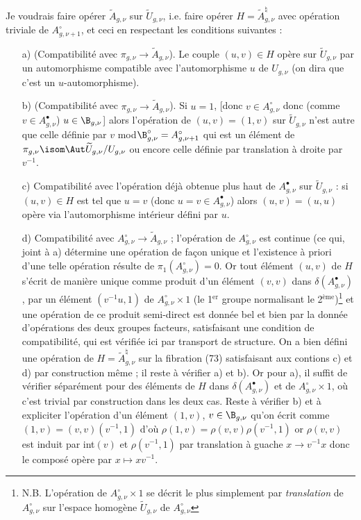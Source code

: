 Je voudrais faire opérer $\widetilde{A}_{g, \nu}$ sur $\widetilde{U}_{g, \nu}$, i.e. faire opérer $H = \widetilde{A}^\natural_{g, \nu}$ avec opération triviale de $A^\circ_{g, \nu + 1}$, et ceci en respectant les conditions suivantes :
\begin{enumerate}
    \item[a)] (Compatibilité avec $\pi_{g, \nu} \to \widetilde{A}_{g, \nu}$). Le couple $(u, v) \in H$ opère sur $\widetilde{U}_{g, \nu}$ par un automorphisme compatible avec l'automorphisme $u$ de $U_{g, \nu}$ (on dira que c'est un $u$-automorphisme). 
    \item[b)] (Compatibilité avec $\pi_{g, \nu} \to \widetilde{A}_{g, \nu}$). Si $u = 1$, [donc $v \in A^\circ_{g, \nu}$ donc (comme $v \in A^\bullet_{g, \nu}$) $u \in \B_{g, \nu}$] alors l'opération de $(u, v) = (1, v)$ sur $\widetilde{U}_{g, \nu}$ n'est autre que celle définie par $v$ mod$\B^\circ_{g, \nu} = A^\circ_{g, \nu + 1}$ qui est un élément de $\pi_{g, \nu} \isom \Aut \widetilde{U}_{g, \nu}/U_{g, \nu}$ ou encore celle définie par translation à droite par $v^{-1}$.
    \item[c)] Compatibilité avec l'opération déjà obtenue plus haut de $A^\bullet_{g, \nu}$ sur $\widetilde{U}_{g, \nu}$ : si $(u, v) \in H$ est tel que $u = v$ (donc $u = v \in A^\bullet_{g, \nu}$) alors $(u, v) = (u, u)$ opère via l'automorphisme intérieur défini par $u$.
    \item[d)] Compatibilité avec $A^\circ_{g, \nu} \to \widetilde{A}_{g, \nu}$ ; l'opération de $A^\circ_{g, \nu}$ est continue (ce qui, joint à a) détermine une opération de fa\c{c}on unique et l'existence à priori d'une telle opération résulte de $\pi_1(A^\circ_{g, \nu}) = 0$. Or tout élément $(u, v)$ de $H$ s'écrit de manière unique comme produit d'un élément $(v, v)$ dans $\delta (A^\bullet_{g, \nu})$, par un élément $(v^{-1}u, 1)$ de $A^\circ_{g, \nu} \times 1$ (le 1$^{\text{er}}$ groupe normalisant le 2$^{\text{ème}}$)\footnote{N.B. L'opération de $A^\circ_{g, \nu} \times 1$ se décrit le plus simplement par \emph{translation} de $A^\circ_{g, \nu}$ sur l'espace homogène $\widetilde{U}_{g, \nu}$ de $A^\circ_{g, \nu}$} et une opération de ce produit semi-direct est donnée bel et bien par la donnée d'opérations des deux groupes facteurs, satisfaisant une condition de compatibilité, qui est vérifiée ici par transport de structure. On a bien défini une opération de $H = \widetilde{A}^\natural_{g, \nu}$ sur la fibration (73) satisfaisant aux contions c) et d) par construction même ; il reste à vérifier a) et b). Or pour a), il suffit de vérifier séparément pour des éléments de $H$ dans $\delta (A^\bullet_{g, \nu})$ et de $A^\circ_{g, \nu} \times 1$, où c'est trivial par construction dans les deux cas. Reste à vérifier b) et à expliciter l'opération d'un élément $(1, v)$, $v \in \B_{g, \nu}$ qu'on écrit comme $(1, v) = (v, v)(v^{-1}, 1)$ d'où $\rho (1, v) = \rho(v, v) \rho(v^{-1}, 1)$ or $\rho(v, v)$ est induit par int$(v)$ et $\rho(v^{-1}, 1)$ par translation à guache $x \to v^{-1}x$ donc le composé opère par $x \mapsto xv^{-1}$.
\end{enumerate}

